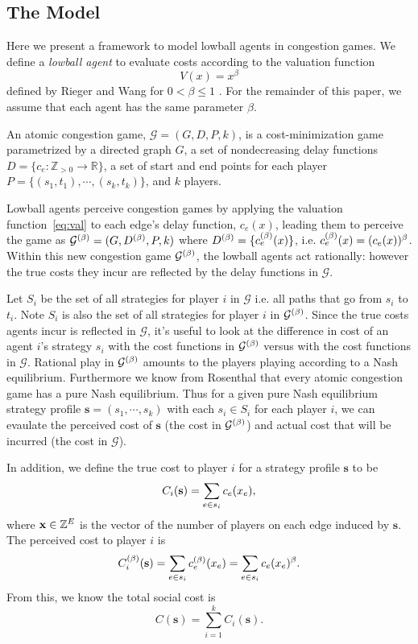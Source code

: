 \documentclass[twoside]{article}
\begin{document}
\begin{multicols}{2}
\section{The Model}

Here we present a framework to model lowball agents in congestion games. We define a 
\textit{lowball agent} to evaluate costs according to the valuation function
\begin{equation}
  V(x) = x^{\beta}
  \label{eq:val}
\end{equation}
defined by Rieger and Wang for $0 < \beta \le 1$ \cite{Rieger2008}. For the
remainder of this paper, we assume that each agent has the same parameter
$\beta$.

An atomic congestion game, $\mathcal{G} = (G, D, P, k)$, is a cost-minimization
game parametrized by a directed graph $G$, a set of nondecreasing delay
functions $D = \{c_e : \mathbb{Z}_{>0} \to \mathbb{R}\}$, a set of start and end
points for each player $P =\{(s_1, t_1), \cdots, (s_k, t_k)\}$, and $k$ players.

Lowball agents perceive congestion games by applying the valuation
function~\eqref{eq:val} to each edge's delay function, $c_e(x)$, leading them to
perceive the game as $\mathcal{G}^{(\beta)}= (G, D^{(\beta)}, P, k)$ where $D^{(\beta)} =
\{c_e^{(\beta)}(x)\}$, i.e. $c_e^{(\beta)}(x) = (c_e(x))^\beta$. Within this new
congestion game $\mathcal{G}^{(\beta)}$, the lowball agents act rationally: however
the true costs they incur are reflected by the delay functions in $\mathcal{G}$.   

Let $S_i$ be the set of all strategies for player $i$ in $\mathcal{G}$ i.e. all
paths that go from $s_i$ to $t_i$.  Note $S_i$ is also the set of all strategies for
player $i$ in $\mathcal{G}^{(\beta)}$.  Since the true costs agents incur is
reflected in $\mathcal{G}$, it's useful to look at the difference in cost of an
agent $i$'s strategy $s_i$ with the
cost functions in $\mathcal{G}^{(\beta)}$ versus with the cost functions in $\mathcal{G}$.
Rational play in $\mathcal{G}^{(\beta)}$ amounts to the players playing according to
a Nash equilibrium.  Furthermore we know from Rosenthal \cite{Rosenthal1973}
that every atomic congestion game has a pure Nash equilibrium.  Thus for a given
pure Nash equilibrium strategy profile $\mathbf{s} = (s_1, \cdots, s_k)$ with
each $s_i \in S_i$ for each player $i$, we can evaulate the perceived cost of
$\mathbf{s}$ (the cost in $\mathcal{G}^{(\beta)}$) and actual cost that will be
incurred (the cost in $\mathcal{G}$).

In addition, we define the true cost to player $i$ for a strategy profile
$\mathbf{s}$ to be
\[
  C_i(\mathbf{s}) = \sum\limits_{e \in s_i}c_e(x_e),
\]
where $\mathbf{x}
\in \mathbb{Z}^E$ is the vector of the number of players on each edge induced by
$\mathbf{s}$.  The perceived cost to player $i$ is
\[
  C^{(\beta)}_i(\mathbf{s}) = \sum\limits_{e \in s_i}c_e^{(\beta)}(x_e) = \sum\limits_{e \in
  s_i}c_e(x_e)^\beta.
\]
From this, we know the total social cost is
\[
  C(\mathbf{s}) = \sum_{i=1}^{k}C_i(\mathbf{s}).
\]
        

\end{multicols}
\end{document}
